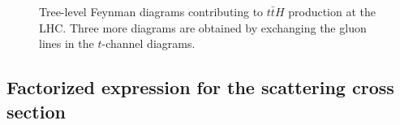 \documentclass[aps,preprint,tightenlines,floatfix,superscriptaddress,nofootinbib,showpacs]{revtex4-1}
\def\tbar{\bar{t}}
\begin{document}
\begin{center}
\begin{figure}[H]
\vspace*{0.02\textwidth}
\caption{Tree-level Feynman diagrams contributing to $t\tbar H$ production
  at the LHC. Three more diagrams are obtained by exchanging the gluon
  lines in the $t$-channel diagrams.}
\label{fig1}
\end{figure}
\end{center}
\subsection{Factorized expression for the scattering cross section}
\label{subsec:factorize}
\end{document}
